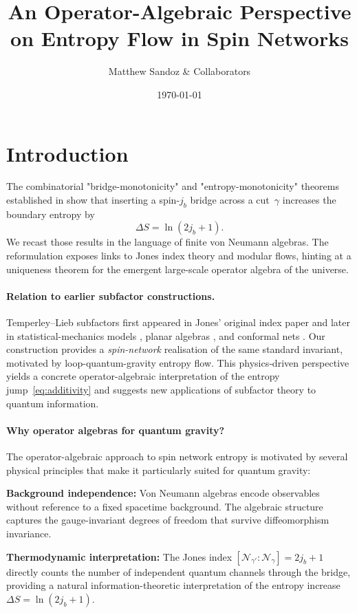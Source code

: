 \documentclass[11pt]{article}
\begin{document}
\title{An Operator-Algebraic Perspective on Entropy Flow in Spin Networks}
\author{\small Matthew Sandoz \& Collaborators}
\date{\today}
\maketitle

\section{Introduction}
The combinatorial "bridge-monotonicity" and "entropy-monotonicity" theorems
established in \cite{BridgeMono,EntropyMono}
show that inserting a spin-$j_b$ bridge across a cut~$\gamma$ increases the
boundary entropy by
\[
  \Delta S = \ln(2j_b+1).
\]
We recast those results in the language of finite von Neumann algebras.  
The reformulation exposes links to Jones index theory and modular flows, hinting
at a uniqueness theorem for the emergent large-scale operator algebra of the
universe.

\paragraph{Relation to earlier subfactor constructions.}
Temperley--Lieb subfactors first appeared in Jones’ original index
paper \cite{Jones1983} and later in statistical-mechanics models
\cite{KauffmanLins}, planar algebras \cite{JonesPA}, and conformal nets
\cite{KawahigashiLongo}.  
Our construction provides a \emph{spin-network} realisation of the same
standard invariant, motivated by loop-quantum-gravity entropy flow.
This physics‐driven perspective yields a concrete operator-algebraic
interpretation of the entropy jump~\eqref{eq:additivity} and suggests
new applications of subfactor theory to quantum information.

\paragraph{Why operator algebras for quantum gravity?}
The operator-algebraic approach to spin network entropy is motivated by several 
physical principles that make it particularly suited for quantum gravity:

\textbf{Background independence:} Von Neumann algebras encode observables without 
reference to a fixed spacetime background. The algebraic structure captures the 
gauge-invariant degrees of freedom that survive diffeomorphism invariance.

\textbf{Thermodynamic interpretation:} The Jones index $[\mathcal{N}_{\gamma'}:\mathcal{N}_\gamma] = 2j_b+1$ 
directly counts the number of independent quantum channels through the bridge, 
providing a natural information-theoretic interpretation of the entropy increase
$\Delta S = \ln(2j_b+1)$.
\end{document}
